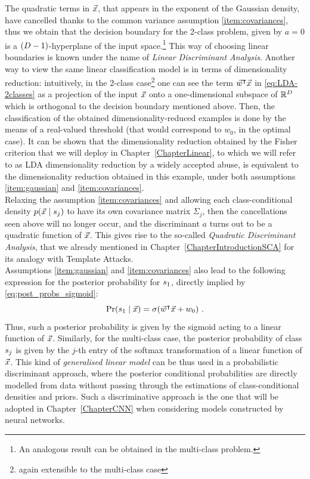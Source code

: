 The quadratic terms in $\vec{x}$, that appears in the exponent of the Gaussian density, have cancelled thanks to the common variance assumption \ref{item:covariances}, thus we obtain that the decision boundary for the 2-class problem, given by $a=0$ is a $(D - 1)$-hyperplane of the input space.\footnote{An analogous result can be obtained in the multi-class problem.} This way of choosing linear boundaries is known under the name of \emph{Linear Discriminant Analysis}. Another way to view the same linear classification model is in terms of dimensionality reduction: intuitively, in the 2-class case\footnote{again extensible to the multi-class case} one can see the term $\vec{w}^\intercal \vec{x}$ in \eqref{eq:LDA-2classes} as a projection of the input $\vec{x}$ onto a one-dimensional subspace of $\mathbb{R}^D$ which is orthogonal to the decision boundary mentioned above. Then, the classification of the obtained dimensionality-reduced examples is done by the means of a real-valued threshold (that would correspond to $w_0$, in the optimal case). It can be shown that the dimensionality reduction obtained by the Fisher criterion that we will deploy in Chapter~\ref{ChapterLinear}, to which we will refer to as LDA dimensionality reduction by a widely accepted abuse, is equivalent to the dimensionality reduction obtained in this example, under both assumptions \ref{item:gaussian} and \ref{item:covariances}.  \\
Relaxing the assumption \ref{item:covariances} and allowing each class-conditional density $p(\vec{x}\mid s_{j})$ to have its own covariance matrix $\Sigma_j$, then the cancellations seen above will no longer occur, and the discriminant $a$ turns out to be a quadratic function of $\vec{x}$. This gives rise to the so-called \emph{Quadratic Discriminant Analysis}, that we already mentioned in Chapter~\ref{ChapterIntroductionSCA} for its analogy with Template Attacks.\\

Assumptions \ref{item:gaussian} and \ref{item:covariances} also lead to the following expression for the posterior probability for $s_{1}$, directly implied by \eqref{eq:post_probs_sigmoid}: 
\begin{equation}\label{eq:binary_linear_classifier}
\prob(\given{\sensVarValue{1}}{\vLeakVec}) = \sigma(\www^\intercal \vLeakVec + w_0)\mbox{ .}
\end{equation}
Thus, such a posterior probability is given by the sigmoid acting to a linear function of $\vec{x}$. Similarly, for the multi-class case, the posterior probability of class $s_{j}$ is given by the $j$-th entry of the softmax transformation of a linear function of $\vec{x}$. This kind of \emph{generalised linear model} can be thus used in a probabilistic discriminant approach, where the posterior conditional probabilities are directly modelled from data without passing through the estimations of class-conditional densities and priors. Such a discriminative approach is the one that will be adopted in Chapter~\ref{ChapterCNN} when considering models constructed by neural networks.

